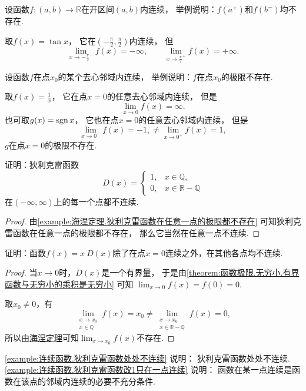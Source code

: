 \begin{example}
设函数\(f\colon(a,b)\to\mathbb{R}\)在开区间\((a,b)\)内连续，
举例说明：\(f(a^+)\)和\(f(b^-)\)均不存在.
\begin{solution}
取\(f(x) = \tan x\)，
它在\(\left( -\frac\pi2,\frac\pi2 \right)\)内连续，
但\[
	\lim_{x\to-\frac\pi2^-} f(x) = -\infty,
	\qquad
	\lim_{x\to\frac\pi2^+} f(x) = +\infty.
\]
\end{solution}
\end{example}
\begin{example}
设函数\(f\)在点\(x_0\)的某个去心邻域内连续，
举例说明：\(f\)在点\(x_0\)的极限不存在.
\begin{solution}
取\(f(x) = \frac1x\)，
它在点\(x=0\)的任意去心邻域内连续，
但是\[
	\lim_{x\to0} f(x) = \infty.
\]
也可取\(g(x) = \operatorname{sgn} x\)，
它也在点\(x=0\)的任意去心邻域内连续，
但是\[
	\lim_{x\to0^-} f(x) = -1,
	\neq
	\lim_{x\to0^+} f(x) = 1,
\]
\(g\)在点\(x=0\)的极限不存在.
\end{solution}
\end{example}

\begin{example}\label{example:连续函数.狄利克雷函数处处不连续}
证明：狄利克雷函数\[
	D(x) = \left\{ \begin{array}{ll}
		1, & x \in \mathbb{Q}, \\
		0, & x \in \mathbb{R}-\mathbb{Q}
	\end{array} \right.
\]在\((-\infty,\infty)\)上的每一个点都不连续.
\begin{proof}
由\cref{example:海涅定理.狄利克雷函数在任意一点的极限都不存在}
可知狄利克雷函数在任意一点的极限都不存在，
那么它当然在任意一点不连续.
\end{proof}
\end{example}
\begin{example}\label{example:连续函数.狄利克雷函数改1只在一点连续}
证明：函数\(f(x) = x~D(x)\)除了在点\(x=0\)连续之外，在其他各点均不连续.
\begin{proof}
当\(x\to0\)时，\(D(x)\)是一个有界量，
于是由\cref{theorem:函数极限.无穷小.有界函数与无穷小的乘积是无穷小} 可知
\(\lim_{x\to0} f(x) = f(0) = 0\).

取\(x_0\neq0\)，有\[
	\lim_{\substack{x \to x_0 \\ x \in \mathbb{Q}}} f(x)
	= x_0
	\neq
	\lim_{\substack{x \to x_0 \\ x \in \mathbb{R}-\mathbb{Q}}} f(x)
	= 0,
\]
所以由\hyperref[theorem:极限.海涅定理]{海涅定理}可知\(\lim_{x \to x_0} f(x)\)不存在.
\end{proof}
\end{example}
\begin{remark}
\cref{example:连续函数.狄利克雷函数处处不连续} 说明：
狄利克雷函数处处不连续.
\cref{example:连续函数.狄利克雷函数改1只在一点连续} 说明：
函数在某一点连续是函数在该点的邻域内连续的必要不充分条件.
\end{remark}

